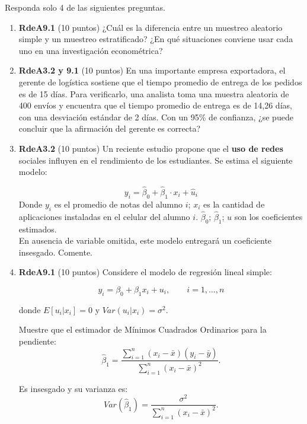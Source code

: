 \documentclass[10pt,a4paper]{article}
\begin{document}
Responda solo 4 de las siguientes preguntas.
\begin{enumerate}
    \item \textbf{RdeA9.1} (10 puntos) 
¿Cuál es la diferencia entre un muestreo aleatorio simple y un muestreo estratificado? ¿En qué situaciones conviene usar cada uno en una investigación econométrica?



    \item \textbf{RdeA3.2 y 9.1}  (10 puntos) 
En una importante empresa exportadora, el gerente de logística sostiene que el tiempo promedio de entrega de los pedidos es de 15 días.  
Para verificarlo, una analista toma una muestra aleatoria de 400 envíos y encuentra que el tiempo promedio de entrega es de 14,26 días, con una desviación estándar de 2 días.  
Con un 95\% de confianza, ¿se puede concluir que la afirmación del gerente es correcta?


    \item \textbf{RdeA3.2} (10 puntos) 
    Un reciente estudio propone que el {\bf uso de redes} sociales influyen en el rendimiento de los estudiantes. Se estima el siguiente  modelo:
    
    $$y_i = \hat{\beta}_0 + \hat{\beta}_1 \cdot x_i + \hat{u}_i$$
    Donde $y_i$ es el promedio de notas del alumno $i$; $x_i$ es la cantidad de aplicaciones instaladas en el celular del alumno $i$. $\hat{\beta}_0$; $\hat{\beta}_1$; $u$ son los coeficientes estimados.\\
    
    En ausencia de variable omitida, este modelo entregará un coeficiente insesgado. Comente.\\




    \item \textbf{RdeA9.1} (10 puntos) 
Considere el modelo de regresión lineal simple:

\[
y_i = \beta_0 + \beta_1 x_i + u_i, \qquad i=1,\dots,n
\]

donde $E[u_i|x_i]=0$ y $Var(u_i|x_i)=\sigma^2$.

Muestre que el estimador de Mínimos Cuadrados Ordinarios para la pendiente:
    \[
    \hat{\beta}_1 = \frac{\sum_{i=1}^n (x_i - \bar{x})(y_i - \bar{y})}{\sum_{i=1}^n (x_i - \bar{x})^2}.
    \]

Es insesgado y su varianza es:
    \[
    Var(\hat{\beta}_1) = \frac{\sigma^2}{\sum_{i=1}^n (x_i - \bar{x})^2}.
    \]





\end{enumerate}
\end{document}
